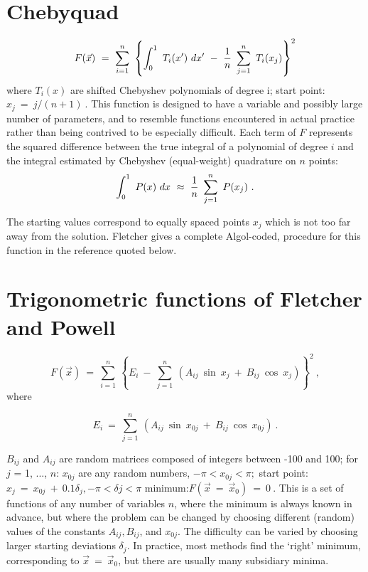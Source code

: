 \section{Chebyquad}
 
 
$$F(\vec{x})~=~\sum^{n}_{i=1}~\left\{\int^1_0~T_i(x^{\prime})~dx^{\prime}~-~{1\over
n}~\sum^{n}_{j=1}~T_i (x_j)\right\}^{2}$$
where $T_i(x)$ are shifted Chebyshev polynomials of degree i;\vskip2mm
\noindent 
start point:{\phantom{xxxxxxxxxxxxxxxxxx}}$x_j~=~j/(n + 1)~.$
\vskip2mm
     This function is designed to have a variable and possibly large
number of parameters, and to resemble functions encountered in actual
practice rather than being contrived to be especially difficult.  Each
term of $F$ represents the squared difference between the true integral
of a polynomial of degree $i$ and the integral estimated by Chebyshev
(equal-weight) quadrature on $n$ points:
 $$\int^{1}_{0}~P(x)~dx~\approx~{1\over n}~\sum^{n}_{j=1}~P(x_j)~.$$
 
The starting values correspond to equally spaced points $x_j$ which is not
too far away from the solution.  Fletcher gives a complete Algol-coded,
procedure for this function in the reference quoted below.\\ 
 
\section{Trigonometric functions of Fletcher and Powell}
$$F(\vec{x})~=~\sum^{n}_{i=1}~\left\{E_i~-~\sum^{n}_{j=1}~(A_{ij}~
\sin~x_j~+~B_{ij}~\cos~x_j)\right\}^{2}~,$$
where
 
 $$E_i~=~\sum^{n}_{j=1}~(A_{ij}~
\sin~x_{0j}~+~B_{ij}~\cos~x_{0j})~.$$
 
$B_{ij} $ and $A_{ij}$ are random matrices composed of integers between -100 and
100;  for $j$ = 1, ..., $n$:  $x_{0j}$ are any random numbers, $-\pi < x_{0j} < \pi;$\vskip2mm
\noindent 
start point:{\phantom{xxxxxxxxxxxxxxxxxx}}$x_j~=~x_{0j}~+~0.1\delta_j, -\pi < \delta j < \pi$
\vskip2mm
\noindent
minimum:{\phantom{xxxxxxxxxxxxxxxxxxx}}$F(\vec{x}~=~\vec{x}_0)~=~0~. $
\vskip2mm 
     This is a set of functions of any number of variables $n$, where the
minimum is always known in advance, but where the problem can be changed
by choosing different (random) values of the constants $A_{ij}, B_{ij}$, and $x_{0j}$. 
The difficulty can be varied by choosing larger starting deviations  $\delta_j$. 
In practice, most methods find the `right' minimum, corresponding to
$\vec{x}~=~\vec{x}_0$, but there are usually many subsidiary minima.\\ 
